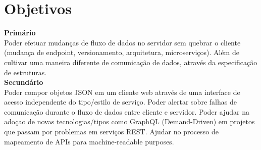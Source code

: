 \section[Objetivos]{Objetivos}

\textbf{Primário} \\

Poder efetuar mudanças de fluxo de dados no servidor sem quebrar o cliente (mudança de endpoint, versionamento, arquitetura, microserviços). Além de cultivar uma maneira diferente de comunicação de dados, através da especificação de estruturas. \\

\textbf{Secundário} \\

Poder compor objetos JSON em um cliente web através de  uma interface de acesso independente do tipo/estilo de serviço. Poder alertar sobre falhas de comunicação durante o fluxo de dados entre cliente e servidor. Poder ajudar na adoçao de novas tecnologias/tipos como GraphQL (Demand-Driven) em projetos que passam por problemas em serviços REST. Ajudar no processo de mapeamento de APIs para machine-readable purposes.
